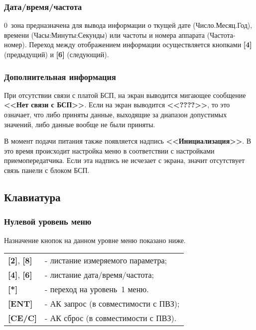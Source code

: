 \subsubsection{Дата/время/частота}

0~зона предназначена для вывода информации о ткущей дате (Число.Месяц.Год), времени (Часы:Минуты:Секунды) или частоты и номера аппарата (Частота-номер). Переход между отображением информации осуществляется кнопками \textbf{[4]} (предыдущий) и \textbf{[6]} (следующий).


\subsubsection{Дополнительная информация}

При отсутствии связи с платой БСП, на экран выводится мигающее сообщение \textbf{<<Нет связи с БСП>>}. Если на экран выводится \textbf{<<????>>}, то это означает, что либо приняты данные, выходящие за диапазон допустимых значений, либо данные вообще не были приняты.

В момент подачи питания также появляется надпись \textbf{<<Инициализация>>}. В это время происходит настройка меню в соответствии с настройками приемопередатчика. Если эта надпись не исчезает с экрана, значит отсутствует связь панели с блоком БСП.
 
 
\subsection{Клавиатура} \label{ssec:keyboard}


\subsubsection{Нулевой уровень меню}

Назначение кнопок на данном уровне меню показано ниже.

\begin{center}
	\begin{tabular}{p{2cm} p{15cm}}
	    \textbf{[2]}, \textbf{[8]} & - листание измеряемого параметра; 	\tabularnewline
	    \textbf{[4]}, \textbf{[6]} & - листание дата/время/частота; 	\tabularnewline
	    \textbf{[*]} & - переход на уровень~1 меню.		 				\tabularnewline
	    \textbf{[ENT]} 	& - АК запрос (в совместимости с ПВЗ);			\tabularnewline
		\textbf{[CE/C]} & - АК сброс (в совместимости с ПВЗ).			\tabularnewline				
	\end{tabular} 
\end{center}



